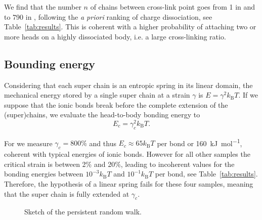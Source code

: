 \documentclass[12pt,a4paper,prl,reprint]{revtex4-1}
\begin{document}
We find that the number $n$ of chains between cross-link point goes from 1 in  and  to 790 in , following the \textit{a priori} ranking of charge dissociation, see Table~\ref{tab:results}. This is coherent with a higher probability of attaching two or more heads on a highly dissociated body, i.e. a large cross-linking ratio.

\subsection{Bounding energy}

Considering that each super chain is an entropic spring in its linear domain, the mechanical energy stored by a single super chain at a strain $\gamma$ is $E = \gamma^2 k_\mathrm{B}T$. If we suppose that the ionic bonds break before the complete extension of the (super)chains, we evaluate the head-to-body bonding energy to
\begin{equation}
E_c = \gamma_c^2 k_\mathrm{B}T.
\label{eq:Ec}
\end{equation}

For  we measure $\gamma_c = 800\%$ and thus $E_c \approx 65 k_\mathrm{B}T$ per bond or \SI{160}{\kilo\joule\per\mol}, coherent with typical energies of ionic bonds. However for all other samples the critical strain is between 2\% and 20\%, leading to incoherent values for the bonding energies between $10^{-3}k_\mathrm{B}T$ and $10^{-1}k_\mathrm{B}T$ per bond, see Table~\ref{tab:results}. Therefore, the hypothesis of a linear spring fails for these four samples, meaning that the super chain is fully extended at $\gamma_c$.

\begin{figure}
\begin{center}
\end{center}
\caption{Sketch of the persistent random walk.}
\label{fig:persistent}
\end{figure}
\end{document}
